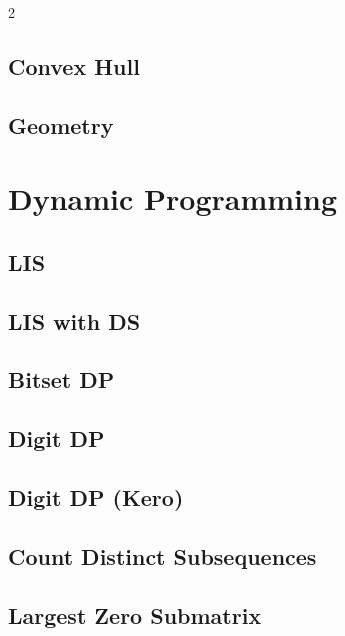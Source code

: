 \documentclass[10pt,a4paper]{extarticle}
\begin{document}
\begin{landscape}
\begin{multicols}{2}
\subsection{Convex Hull}


\subsection{Geometry}


\section{Dynamic Programming}

\subsection{LIS}


\subsection{LIS with DS}


\subsection{Bitset DP}


\subsection{Digit DP}


\subsection{Digit DP (Kero)}


\subsection{Count Distinct Subsequences}


\subsection{Largest Zero Submatrix}



\end{multicols}
\end{landscape}
\end{document}
